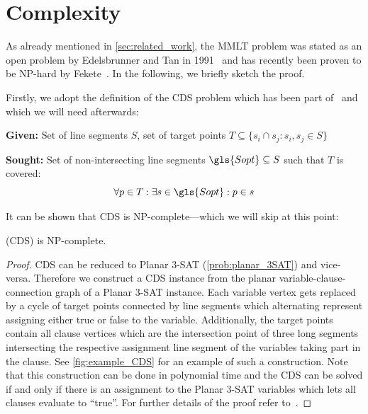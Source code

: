 \section{Complexity}
\label{sec:mmlt_complexity}
As already mentioned in \cref{sec:related_work}, the \gls{MMLT}
problem was stated as an open problem by Edelsbrunner and Tan in
1991~\cite{triangulation_minmax_length} and has recently been proven
to be NP-hard by Fekete~\cite{mmlt_complexity}. In the following, we
briefly sketch the proof.

Firstly, we adopt the definition of the \gls{CDS} problem which has
been part of~\cite{mmlt_complexity} and which we will need
afterwards:

\begin{problem}
  \label{prob:cds}\hfill
  \begin{labeling}{\hspace{4em}}
    \item[\textbf{Given:}]
      Set of line segments \(S\), 
      set of target points
      \(T \subseteq \{ s_i \cap s_j : s_i,s_j \in S \} \)
    \item[\textbf{Sought:}]
      Set of non-intersecting line segments
      \(\gls{Sopt} \subseteq S\) such that \(T\) is covered:
      \[ \forall p \in T: \exists s \in \gls{Sopt} : p \in s \]
  \end{labeling}
\end{problem}

It can be shown that \gls{CDS} is NP-complete---which we will skip at
this point:

\begin{theorem}
  \label{thm:complexity_cds}
   (\gls{CDS}) is NP-complete.
  \begin{proof}
  \gls{CDS} can be reduced to Planar 3-SAT (\cref{prob:planar_3SAT})
  and vice-versa. Therefore we construct a \gls{CDS} instance from
  the planar variable-clause-connection graph of a Planar 3-SAT
  instance. Each variable vertex gets replaced by a cycle of target
  points connected by line segments which alternating
  represent assigning either true or false to the variable.
  Additionally, the target points contain all clause vertices which
  are the intersection point of three long segments intersecting
  the respective assignment line segment of the variables taking
  part in the clause. See \cref{fig:example_CDS} for an example of
  such a construction. Note that this construction can be done in
  polynomial time and the \gls{CDS} can be solved if and
  only if there is an assignment to the Planar 3-SAT variables which
  lets all clauses evaluate to ``true''.
  For further details of the proof refer to~\cite{mmlt_complexity}.
  \end{proof}
\end{theorem}

